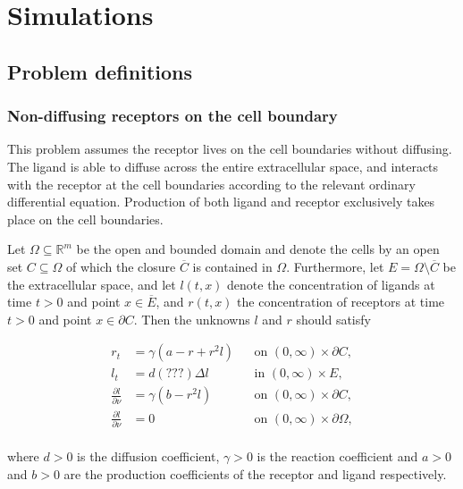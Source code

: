 \documentclass{book}
\theoremstyle{definition}
\begin{document}
\chapter{Simulations}

\section{Problem definitions}

\subsection{Non-diffusing receptors on the cell boundary}

This problem assumes the receptor lives on the cell boundaries without diffusing. The ligand is able to diffuse across the entire extracellular space, and interacts with the receptor at the cell boundaries according to the relevant ordinary differential equation. Production of both ligand and receptor exclusively takes place on the cell boundaries.

Let $\Omega \subseteq \mathbb{R}^{m}$ be the open and bounded domain and denote the cells by an open set $C \subseteq \Omega$ of which the closure $\overline{C}$ is contained in $\Omega$. Furthermore, let $E = \Omega \setminus \overline{C}$ be the extracellular space, and let $l(t, x)$ denote the concentration of ligands at time $t > 0$ and point $x \in \overline{E}$, and $r(t, x)$ the concentration of receptors at time $t > 0$ and point $x \in \partial C$. Then the unknowns $l$ and $r$ should satisfy

\begin{equation}
    \begin{aligned}
        r_t &= \gamma (a - r + r^{2}l) && \text{on } (0, \infty) \times \partial C, \\
        l_t &= d(???) \Delta l && \text{in } (0, \infty) \times E, \\
        \frac{\partial l}{\partial \nu} &= \gamma (b - r^{2}l) && \text{on } (0, \infty) \times \partial C, \\
        \frac{\partial l}{\partial \nu} &= 0 && \text{on } (0, \infty) \times \partial \Omega, \\
    \end{aligned}
\end{equation}

\noindent
where $d > 0$ is the diffusion coefficient, $\gamma > 0$ is the reaction coefficient and $a > 0$ and $b > 0$ are the production coefficients of the receptor and ligand respectively.
\end{document}
